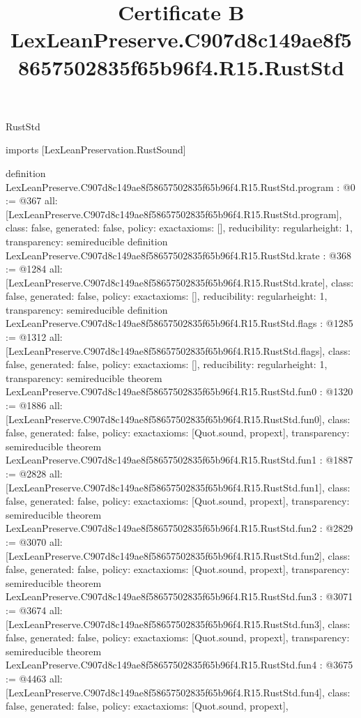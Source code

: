\begin{lexlean}{RustStd}
\title{Certificate B LexLeanPreserve.C907d8c149ae8f58657502835f65b96f4.R15.RustStd}
\begin{coremodule}
imports [LexLeanPreservation.RustSound]

definition LexLeanPreserve.C907d8c149ae8f58657502835f65b96f4.R15.RustStd.program : @0 := @367 {
  all: [LexLeanPreserve.C907d8c149ae8f58657502835f65b96f4.R15.RustStd.program],
  class: false,
  generated: false,
  policy: exact{axioms: []},
  reducibility: regular{height: 1},
  transparency: semireducible
}
definition LexLeanPreserve.C907d8c149ae8f58657502835f65b96f4.R15.RustStd.krate : @368 := @1284 {
  all: [LexLeanPreserve.C907d8c149ae8f58657502835f65b96f4.R15.RustStd.krate],
  class: false,
  generated: false,
  policy: exact{axioms: []},
  reducibility: regular{height: 1},
  transparency: semireducible
}
definition LexLeanPreserve.C907d8c149ae8f58657502835f65b96f4.R15.RustStd.flags : @1285 := @1312 {
  all: [LexLeanPreserve.C907d8c149ae8f58657502835f65b96f4.R15.RustStd.flags],
  class: false,
  generated: false,
  policy: exact{axioms: []},
  reducibility: regular{height: 1},
  transparency: semireducible
}
theorem LexLeanPreserve.C907d8c149ae8f58657502835f65b96f4.R15.RustStd.fun0 : @1320 := @1886 {
  all: [LexLeanPreserve.C907d8c149ae8f58657502835f65b96f4.R15.RustStd.fun0],
  class: false,
  generated: false,
  policy: exact{axioms: [Quot.sound, propext]},
  transparency: semireducible
}
theorem LexLeanPreserve.C907d8c149ae8f58657502835f65b96f4.R15.RustStd.fun1 : @1887 := @2828 {
  all: [LexLeanPreserve.C907d8c149ae8f58657502835f65b96f4.R15.RustStd.fun1],
  class: false,
  generated: false,
  policy: exact{axioms: [Quot.sound, propext]},
  transparency: semireducible
}
theorem LexLeanPreserve.C907d8c149ae8f58657502835f65b96f4.R15.RustStd.fun2 : @2829 := @3070 {
  all: [LexLeanPreserve.C907d8c149ae8f58657502835f65b96f4.R15.RustStd.fun2],
  class: false,
  generated: false,
  policy: exact{axioms: [Quot.sound, propext]},
  transparency: semireducible
}
theorem LexLeanPreserve.C907d8c149ae8f58657502835f65b96f4.R15.RustStd.fun3 : @3071 := @3674 {
  all: [LexLeanPreserve.C907d8c149ae8f58657502835f65b96f4.R15.RustStd.fun3],
  class: false,
  generated: false,
  policy: exact{axioms: [Quot.sound, propext]},
  transparency: semireducible
}
theorem LexLeanPreserve.C907d8c149ae8f58657502835f65b96f4.R15.RustStd.fun4 : @3675 := @4463 {
  all: [LexLeanPreserve.C907d8c149ae8f58657502835f65b96f4.R15.RustStd.fun4],
  class: false,
  generated: false,
  policy: exact{axioms: [Quot.sound, propext]},
}
\end{coremodule}
\end{lexlean}
